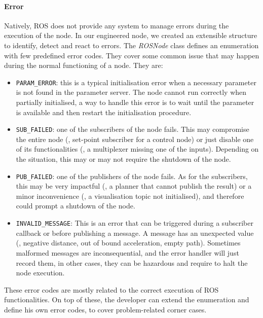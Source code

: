 \paragraph{Error} Natively, ROS does not provide any system to manage errors during the execution of the node. In our engineered node, we created an extensible structure to identify, detect and react to errors. The \textit{ROSNode} class defines an enumeration with few predefined error codes. They cover some common issue that may happen during the normal functioning of a node. They are:
\begin{itemize}
\item \texttt{PARAM\_ERROR}: this is a typical initialisation error when a necessary parameter is not found in the parameter server. The node cannot run correctly when partially initialised, a way to handle this error is to wait until the parameter is available and then restart the initialisation procedure.
\item \texttt{SUB\_FAILED}: one of the subscribers of the node fails. This may compromise the entire node (\eg, set-point subscriber for a control node) or just disable one of its functionalities (\eg, a multiplexer missing one of the inputs). Depending on the situation, this may or may not require the shutdown of the node. 
\item \texttt{PUB\_FAILED}: one of the publishers of the node fails. As for the subscribers, this may be very impactful (\eg, a planner that cannot publish the result) or a minor inconvenience (\eg, a visualisation topic not initialised), and therefore could prompt a shutdown of the node.
\item \texttt{INVALID\_MESSAGE}: This is an error that can be triggered during a subscriber callback or before publishing a message. A message has an unexpected value (\eg, negative distance, out of bound acceleration, empty path). Sometimes malformed messages are inconsequential, and the error handler will just record them, in other cases, they can be hazardous and require to halt the node execution. 
\end{itemize}

These error codes are mostly related to the correct execution of ROS functionalities. On top of these, the developer can extend the enumeration and define his own error codes, to cover problem-related corner cases. 

